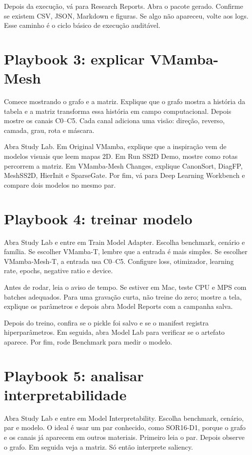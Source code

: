 \documentclass[12pt,oneside]{book}
\begin{document}
Depois da execução, vá para Research Reports. Abra o pacote gerado. Confirme se existem CSV, JSON, Markdown e figuras. Se algo não apareceu, volte aos logs. Esse caminho é o ciclo básico de execução auditável.

\section{Playbook 3: explicar VMamba-Mesh}

Comece mostrando o grafo e a matriz. Explique que o grafo mostra a história da tabela e a matriz transforma essa história em campo computacional. Depois mostre os canais C0--C5. Cada canal adiciona uma visão: direção, reverso, camada, grau, rota e máscara.

Abra Study Lab. Em Original VMamba, explique que a inspiração vem de modelos visuais que leem mapas 2D. Em Run SS2D Demo, mostre como rotas percorrem a matriz. Em VMamba-Mesh Changes, explique CanonSort, DiagFP, MeshSS2D, HierInit e SparseGate. Por fim, vá para Deep Learning Workbench e compare dois modelos no mesmo par.

\section{Playbook 4: treinar modelo}

Abra Study Lab e entre em Train Model Adapter. Escolha benchmark, cenário e família. Se escolher VMamba-T, lembre que a entrada é mais simples. Se escolher VMamba-Mesh-T, a entrada usa C0--C5. Configure loss, otimizador, learning rate, epochs, negative ratio e device.

Antes de rodar, leia o aviso de tempo. Se estiver em Mac, teste CPU e MPS com batches adequados. Para uma gravação curta, não treine do zero; mostre a tela, explique os parâmetros e depois abra Model Reports com a campanha salva.

Depois do treino, confira se o pickle foi salvo e se o manifest registra hiperparâmetros. Em seguida, abra Model Lab para verificar se o artefato aparece. Por fim, rode Benchmark para medir o modelo.

\section{Playbook 5: analisar interpretabilidade}

Abra Study Lab e entre em Model Interpretability. Escolha benchmark, cenário, par e modelo. O ideal é usar um par conhecido, como SOR16-D1, porque o grafo e os canais já aparecem em outros materiais. Primeiro leia o par. Depois observe o grafo. Em seguida veja a matriz. Só então interprete saliency.
\end{document}
